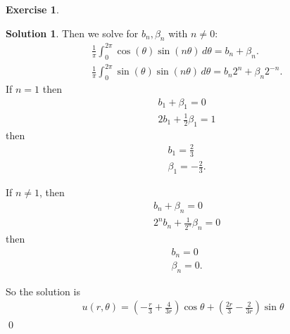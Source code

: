 \documentclass{article}
\theoremstyle{definition}
\newtheorem*{exer*}{Exercise}
\newtheorem*{sln*}{Solution}
\newcommand{\f}[2]{\frac{#1}{#2}}
\newcommand{\lp}{\left(}
\newcommand{\rp}{\right)}
\begin{document}
\begin{exer*}
\begin{sln*}
		
		
		Then we solve for $b_n, \beta_n$ with $n\neq 0$:
		\begin{align*}
		&\f{1}{\pi}\int^{2\pi}_0 \cos(\theta)\sin(n\theta)\,d\theta = b_n + \beta_n.\\
		&\f{1}{\pi}\int^{2\pi}_0 \sin(\theta)\sin(n\theta)\,d\theta = b_n 2^n + \beta_n 2^{-n}.
		\end{align*}
		If $n=1$ then
		\begin{align*}
		& b_1 + \beta_1 = 0\\
		& 2b_1 + \frac{1}{2}\beta_1 = 1
		\end{align*}
		then
		\begin{align*}
		&b_1 = \frac{2}{3}\\
		&\beta_1 = -\frac{2}{3}.
		\end{align*}
		
		If $n\neq 1$, then
		\begin{align*}
		& b_n + \beta_n = 0\\
		& 2^n b_n + \frac{1}{2^n}\beta_n = 0
		\end{align*}
		then 
		\begin{align*}
		&b_n = 0\\
		&\beta_n = 0.
		\end{align*}
		
		So the solution is
		\begin{align*}
		\boxed{u(r,\theta) = \lp -\f{r}{3} + \f{4}{3r} \rp\cos\theta + \lp \f{2r}{3} - \f{2}{3r} \rp\sin\theta }
		\end{align*}\qed
	\end{sln*}
\end{exer*}
\newpage
\end{document}
